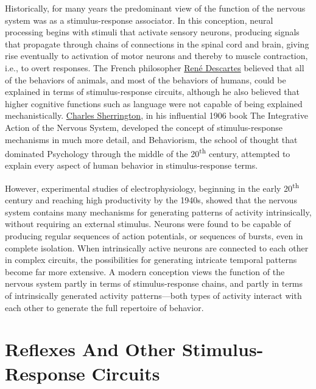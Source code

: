 Historically, for many years the predominant view of the function of the nervous system was as a stimulus-response associator. In this conception, neural processing begins with stimuli that activate sensory neurons, producing signals that propagate through chains of connections in the spinal cord and brain, giving rise eventually to activation of motor neurons and thereby to muscle contraction, i.e., to overt responses. The French philosopher \href{https://en.wikipedia.org/wiki/René_Descartes}{René Descartes} believed that all of the behaviors of animals, and most of the behaviors of humans, could be explained in terms of stimulus-response circuits, although he also believed that higher cognitive functions such as language were not capable of being explained mechanistically. \href{https://en.wikipedia.org/wiki/Charles_Scott_Sherrington}{Charles Sherrington}, in his influential 1906 book The Integrative Action of the Nervous System, developed the concept of stimulus-response mechanisms in much more detail, and Behaviorism, the school of thought that dominated Psychology through the middle of the 20\textsuperscript{th} century, attempted to explain every aspect of human behavior in stimulus-response terms.

However, experimental studies of electrophysiology, beginning in the early 20\textsuperscript{th} century and reaching high productivity by the 1940s, showed that the nervous system contains many mechanisms for generating patterns of activity intrinsically, without requiring an external stimulus. Neurons were found to be capable of producing regular sequences of action potentials, or sequences of bursts, even in complete isolation. When intrinsically active neurons are connected to each other in complex circuits, the possibilities for generating intricate temporal patterns become far more extensive. A modern conception views the function of the nervous system partly in terms of stimulus-response chains, and partly in terms of intrinsically generated activity patterns---both types of activity interact with each other to generate the full repertoire of behavior.

\hypertarget{reflexes-and-other-stimulus-response-circuits}{%
\section{Reflexes And Other Stimulus-Response Circuits}\label{reflexes-and-other-stimulus-response-circuits}}


